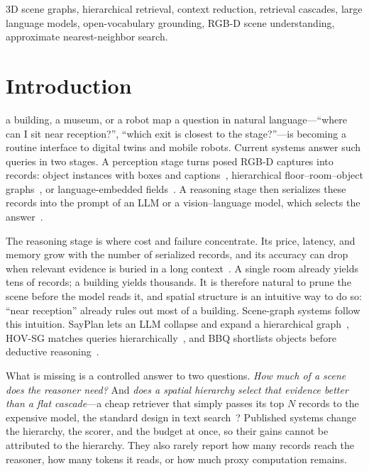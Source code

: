 \documentclass{ieeeaccess}
\begin{document}
\begin{keywords}
3D scene graphs, hierarchical retrieval, context reduction, retrieval cascades,
large language models, open-vocabulary grounding, RGB-D scene understanding,
approximate nearest-neighbor search.
\end{keywords}

\titlepgskip=-15pt
\maketitle

\section{Introduction}
 a building, a museum, or a robot map a question in natural
language---``where can I sit near reception?'', ``which exit is closest to the
stage?''---is becoming a routine interface to digital twins and mobile robots.
Current systems answer such queries in two stages. A perception stage turns
posed RGB-D captures into records: object instances with boxes and
captions~\cite{gu2023conceptgraphs,conceptfusion2023}, hierarchical
floor--room--object graphs~\cite{hovsg2024,hydra2022}, or language-embedded
fields~\cite{kerr2023lerf,langsplat2024}. A reasoning stage then serializes these
records into the prompt of an LLM or a vision--language model, which selects the
answer~\cite{bbq2024,rana2023sayplan}.

The reasoning stage is where cost and failure concentrate. Its price, latency,
and memory grow with the number of serialized records, and its accuracy can drop
when relevant evidence is buried in a long context~\cite{liu2024lostmiddle}. A
single room already yields tens of records; a building yields thousands. It is
therefore natural to prune the scene before the model reads it, and spatial
structure is an intuitive way to do so: ``near reception'' already rules out
most of a building. Scene-graph systems follow this intuition. SayPlan lets an
LLM collapse and expand a hierarchical graph~\cite{rana2023sayplan}, HOV-SG
matches queries hierarchically~\cite{hovsg2024}, and BBQ shortlists objects
before deductive reasoning~\cite{bbq2024}.

What is missing is a controlled answer to two questions. \emph{How much of a
scene does the reasoner need?} And \emph{does a spatial hierarchy select that
evidence better than a flat cascade}---a cheap retriever that simply passes its
top $N$ records to the expensive model, the standard design in text
search~\cite{colbert2020,plaid2022}? Published systems change the hierarchy, the
scorer, and the budget at once, so their gains cannot be attributed to the
hierarchy. They also rarely report how many records reach the reasoner, how many
tokens it reads, or how much proxy computation remains.
\end{document}
